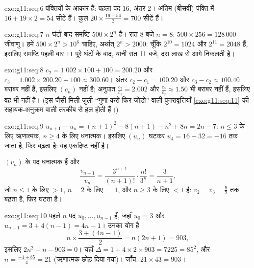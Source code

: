 \begin{solution}{exo:g11:seq:6}
पंक्तियों के आकार  हैं: पहला पद $16$, अंतर $2$। अंतिम (बीसवीं) पंक्ति
में $16 + 19 \times 2 = 54$ सीटें हैं। कुल $20 \times \frac{16 + 54}{2} = 700$ सीटें हैं।
\end{solution}

\begin{solution}{exo:g11:seq:7}
$n$ घंटों बाद समष्टि $500 \times 2^n$ है। रात 8 बजे $n = 8$: $500 \times 256 = 128\,000$ जीवाणु। हमें $500 \times 2^n >
10^6$ चाहिए,
अर्थात् $2^n > 2000$: चूँकि $2^{10} = 1024$ और $2^{11} = 2048$ हैं, इसलिए समष्टि पहली बार $11$ पूरे घंटों
के बाद, यानी रात 11 बजे, दस लाख से आगे निकलती है।
\end{solution}

\begin{solution}{exo:g11:seq:8}
$c_2 = 1.002 \times 100 + 100 = 200.20$ और $c_3 = 1.002 \times 200.20 + 100 \approx 300.60$। अंतर $c_2 - c_1 = 100.20$ और $c_3 - c_2 \approx 100.40$ बराबर नहीं हैं, इसलिए $(c_n)$  नहीं है;
अनुपात $\frac{c_2}{c_1} = 2.002$ और $\frac{c_3}{c_2} \approx 1.50$ भी बराबर नहीं हैं, इसलिए वह  भी नहीं है। (इस
जैसी मिली-जुली ``गुणा करो फिर जोड़ो'' वाली पुनरावृत्तियाँ \cref{exo:g11:seq:11} की
सहायक-अनुक्रम वाली तरकीब से हल होती हैं।)
\end{solution}

\begin{solution}{exo:g11:seq:9}
$u_{n+1} - u_n = (n+1)^2 - 8(n+1) - n^2 + 8n = 2n - 7$: $n \leq 3$ के लिए ऋणात्मक, $n \geq 4$ के लिए धनात्मक। इसलिए $(u_n)$ घटकर $u_4 = 16 - 32 = -16$ तक
जाता है, फिर बढ़ता है: वह एकदिष्ट नहीं है।

$(v_n)$ के पद धनात्मक हैं और
\[
\frac{v_{n+1}}{v_n} = \frac{3^{n+1}}{(n+1)!} \cdot \frac{n!}{3^n}
= \frac{3}{n+1},
\]
जो $n \leq 1$ के लिए $> 1$, $n = 2$ के लिए $= 1$, और $n \geq 3$ के लिए $< 1$ है:  $v_2 = v_3 = \frac92$
तक बढ़ता है, फिर घटता है।
\end{solution}

\begin{solution}{exo:g11:seq:10}
पहले $n$ पद $u_0, \dots, u_{n-1}$ हैं, जहाँ $u_0 = 3$ और $u_{n-1} = 3 + 4(n-1) = 4n - 1$। उनका योग है
\[
n \times \frac{3 + (4n-1)}{2} = n(2n + 1) = 903,
\]
इसलिए $2n^2 + n - 903 = 0$। यहाँ $\Delta = 1 + 4 \times 2 \times 903 =
7225 = 85^2$, और $n = \frac{-1 + 85}{4} = 21$ (ऋणात्मक  छोड़ दिया गया)। जाँच: $21 \times 43 = 903$।
\end{solution}

